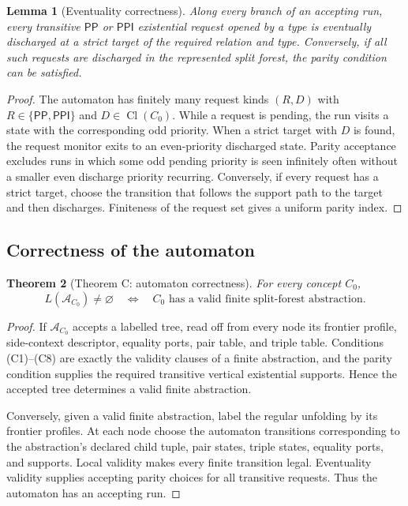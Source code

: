 \documentclass[11pt]{article}
\newtheorem{theorem}{Theorem}[section]
\newtheorem{lemma}[theorem]{Lemma}
\newcommand{\PP}{\mathsf{PP}}
\newcommand{\PPI}{\mathsf{PPI}}
\newcommand{\Cl}{\operatorname{Cl}}
\newcommand{\Aut}{\mathcal A}
\begin{document}
\begin{lemma}[Eventuality correctness]
Along every branch of an accepting run, every transitive $\PP$ or $\PPI$ existential request opened by a type is eventually discharged at a strict target of the required relation and type.  Conversely, if all such requests are discharged in the represented split forest, the parity condition can be satisfied.
\end{lemma}

\begin{proof}
The automaton has finitely many request kinds $(R,D)$ with $R\in\{\PP,\PPI\}$ and $D\in\Cl(C_0)$.  While a request is pending, the run visits a state with the corresponding odd priority.  When a strict target with $D$ is found, the request monitor exits to an even-priority discharged state.  Parity acceptance excludes runs in which some odd pending priority is seen infinitely often without a smaller even discharge priority recurring.  Conversely, if every request has a strict target, choose the transition that follows the support path to the target and then discharges.  Finiteness of the request set gives a uniform parity index.
\end{proof}

\subsection{Correctness of the automaton}

\begin{theorem}[Theorem C: automaton correctness]
For every concept $C_0$,
\[
  L(\Aut_{C_0})\ne\varnothing
  \quad\Longleftrightarrow\quad
  C_0\text{ has a valid finite split-forest abstraction.}
\]
\end{theorem}

\begin{proof}
If $\Aut_{C_0}$ accepts a labelled tree, read off from every node its frontier profile, side-context descriptor, equality ports, pair table, and triple table.  Conditions (C1)--(C8) are exactly the validity clauses of a finite abstraction, and the parity condition supplies the required transitive vertical existential supports.  Hence the accepted tree determines a valid finite abstraction.

Conversely, given a valid finite abstraction, label the regular unfolding by its frontier profiles.  At each node choose the automaton transitions corresponding to the abstraction's declared child tuple, pair states, triple states, equality ports, and supports.  Local validity makes every finite transition legal.  Eventuality validity supplies accepting parity choices for all transitive requests.  Thus the automaton has an accepting run.
\end{proof}
\end{document}
